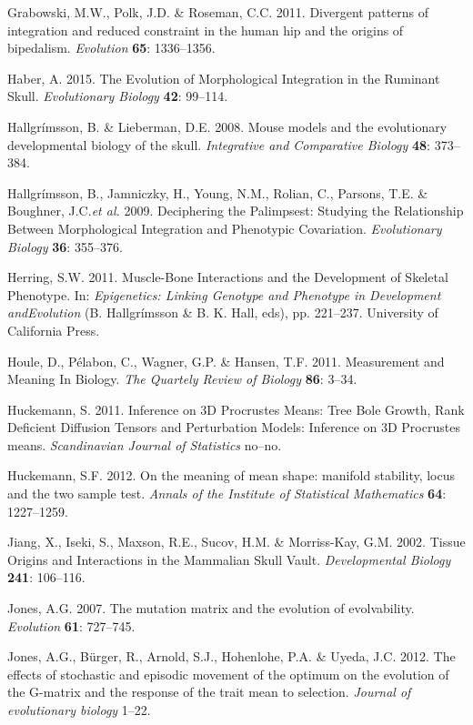 \documentclass[12pt,]{article}
\begin{document}
Grabowski, M.W., Polk, J.D. \& Roseman, C.C. 2011. Divergent patterns of
integration and reduced constraint in the human hip and the origins of
bipedalism. \emph{Evolution} \textbf{65}: 1336--1356.

Haber, A. 2015. The Evolution of Morphological Integration in the
Ruminant Skull. \emph{Evolutionary Biology} \textbf{42}: 99--114.

Hallgrímsson, B. \& Lieberman, D.E. 2008. Mouse models and the
evolutionary developmental biology of the skull. \emph{Integrative and
Comparative Biology} \textbf{48}: 373--384.

Hallgrímsson, B., Jamniczky, H., Young, N.M., Rolian, C., Parsons, T.E.
\& Boughner, J.C.\emph{et al.} 2009. Deciphering the Palimpsest:
Studying the Relationship Between Morphological Integration and
Phenotypic Covariation. \emph{Evolutionary Biology} \textbf{36}:
355--376.

Herring, S.W. 2011. Muscle-Bone Interactions and the Development of
Skeletal Phenotype. In: \emph{Epigenetics: Linking Genotype and
Phenotype in Development andEvolution} (B. Hallgrímsson \& B. K. Hall,
eds), pp. 221--237. University of California Press.

Houle, D., Pélabon, C., Wagner, G.P. \& Hansen, T.F. 2011. Measurement
and Meaning In Biology. \emph{The Quartely Review of Biology}
\textbf{86}: 3--34.

Huckemann, S. 2011. Inference on 3D Procrustes Means: Tree Bole Growth,
Rank Deficient Diffusion Tensors and Perturbation Models: Inference on
3D Procrustes means. \emph{Scandinavian Journal of Statistics} no--no.

Huckemann, S.F. 2012. On the meaning of mean shape: manifold stability,
locus and the two sample test. \emph{Annals of the Institute of
Statistical Mathematics} \textbf{64}: 1227--1259.

Jiang, X., Iseki, S., Maxson, R.E., Sucov, H.M. \& Morriss-Kay, G.M.
2002. Tissue Origins and Interactions in the Mammalian Skull Vault.
\emph{Developmental Biology} \textbf{241}: 106--116.

Jones, A.G. 2007. The mutation matrix and the evolution of evolvability.
\emph{Evolution} \textbf{61}: 727--745.

Jones, A.G., Bürger, R., Arnold, S.J., Hohenlohe, P.A. \& Uyeda, J.C.
2012. The effects of stochastic and episodic movement of the optimum on
the evolution of the G-matrix and the response of the trait mean to
selection. \emph{Journal of evolutionary biology} 1--22.
\end{document}

